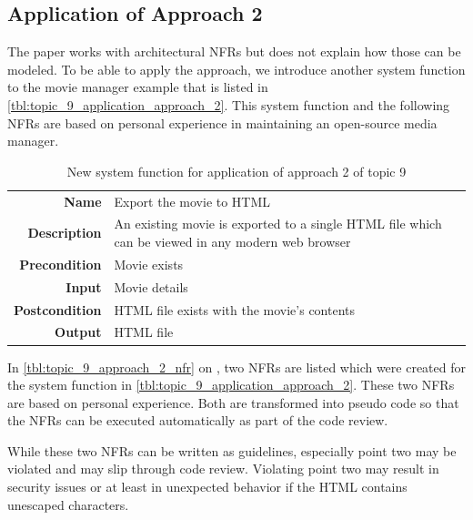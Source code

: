 \subsection{Application of Approach 2}

The paper works with architectural NFRs but does not explain how those can be modeled.
To be able to apply the approach, we introduce another system function to the movie manager example that is listed in \autoref{tbl:topic_9_application_approach_2}.
This system function and the following NFRs are based on personal experience in maintaining an open-source media manager.

\begin{table}[h!]
	\centering
	\caption{New system function for application of approach 2 of topic 9}
	\label{tbl:topic_9_application_approach_2}
	\begin{tabular}{rp{}}
		\textbf{Name}          & Export the movie to HTML \\
		\textbf{Description}   & An existing movie is exported to a single HTML file which can be viewed in any modern web browser \\
		\textbf{Precondition}  & Movie exists \\
		\textbf{Input}         & Movie details \\
		\textbf{Postcondition} & HTML file exists with the movie's contents \\
		\textbf{Output}        & HTML file \\
	\end{tabular}
\end{table}

In \autoref{tbl:topic_9_approach_2_nfr} on , two NFRs are listed which were created for the system function in \autoref{tbl:topic_9_application_approach_2}. 
These two NFRs are based on personal experience.
Both are transformed into pseudo code so that the NFRs can be executed automatically as part of the code review.

While these two NFRs can be written as guidelines, especially point two may be violated and may slip through code review. Violating point two may result in security issues or at least in unexpected behavior if the HTML contains unescaped characters.

